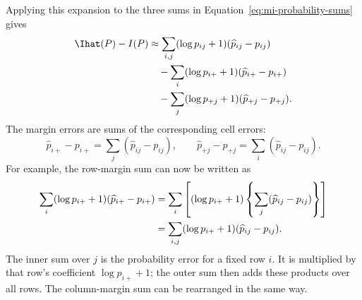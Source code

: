 Applying this expansion to the three sums in
Equation~\eqref{eq:mi-probability-sums} gives
\begin{align}
  \Ihat(P)-I(P)
  &\approx
  \sum_{i,j}(\log p_{ij}+1)(\widehat p_{ij}-p_{ij})
  \notag\\
  &\quad
  -\sum_i(\log p_{i+}+1)(\widehat p_{i+}-p_{i+})
  \notag\\
  &\quad
  -\sum_j(\log p_{+j}+1)(\widehat p_{+j}-p_{+j}).
  \label{eq:mi-first-order-three-sums}
\end{align}
The margin errors are sums of the corresponding cell errors:
\begin{equation}
  \widehat p_{i+}-p_{i+}
  =\sum_j(\widehat p_{ij}-p_{ij}),
  \qquad
  \widehat p_{+j}-p_{+j}
  =\sum_i(\widehat p_{ij}-p_{ij}).
  \label{eq:margin-errors-from-cells}
\end{equation}
For example, the row-margin sum can now be written as
\begin{align}
  \sum_i(\log p_{i+}+1)(\widehat p_{i+}-p_{i+})
  &=\sum_i\left[
    (\log p_{i+}+1)
    \left\{\sum_j(\widehat p_{ij}-p_{ij})\right\}
    \right]
  \notag\\
  &=\sum_{i,j}(\log p_{i+}+1)(\widehat p_{ij}-p_{ij}).
\end{align}
The inner sum over \(j\) is the probability error for a fixed row \(i\). It
is multiplied by that row's coefficient \(\log p_{i+}+1\); the outer sum then
adds these products over all rows. The column-margin sum can be rearranged in
the same way.

